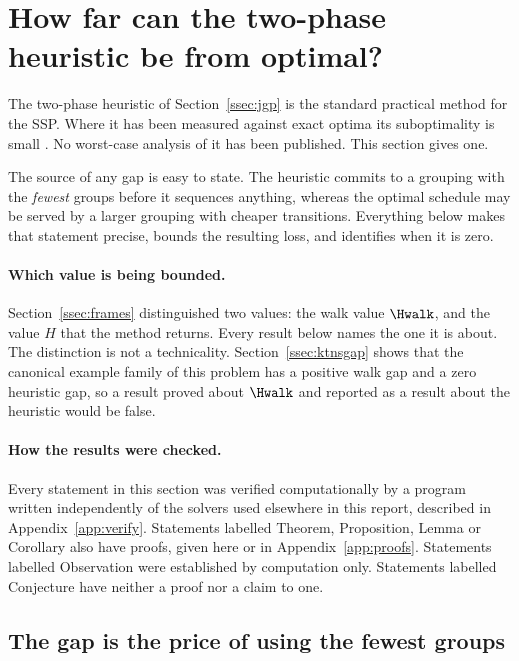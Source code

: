 \section{How far can the two-phase heuristic be from optimal?}\label{sec:gap}

The two-phase heuristic of Section~\ref{ssec:jgp} is the standard practical method
for the SSP. Where it has been measured against exact optima its suboptimality is
small \citep{Burger2015}. No worst-case analysis of it has been published. This
section gives one.

The source of any gap is easy to state. The heuristic commits to a grouping with the
\emph{fewest} groups before it sequences anything, whereas the optimal schedule may
be served by a larger grouping with cheaper transitions. Everything below makes that
statement precise, bounds the resulting loss, and identifies when it is zero.

\paragraph{Which value is being bounded.}
Section~\ref{ssec:frames} distinguished two values: the walk value $\Hwalk$, and the
value $H$ that the method returns. Every result below names the one it is about. The
distinction is not a technicality. Section~\ref{ssec:ktnsgap} shows that the
canonical example family of this problem has a positive walk gap and a zero
heuristic gap, so a result proved about $\Hwalk$ and reported as a result about the
heuristic would be false.

\paragraph{How the results were checked.}
Every statement in this section was verified computationally by a program written
independently of the solvers used elsewhere in this report, described in
Appendix~\ref{app:verify}. Statements labelled Theorem, Proposition, Lemma or
Corollary also have proofs, given here or in Appendix~\ref{app:proofs}. Statements
labelled Observation were established by computation only. Statements labelled
Conjecture have neither a proof nor a claim to one.

\subsection{The gap is the price of using the fewest groups}\label{ssec:exact}

